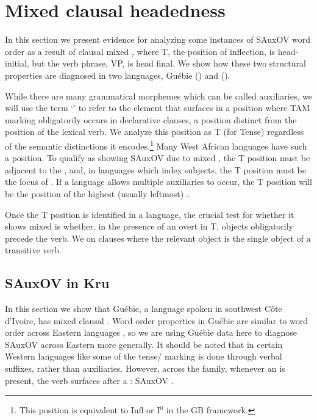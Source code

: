 \documentclass[output=paper]{LSP/langsci}
\begin{document}
\section{Mixed clausal headedness}\label{sec:strictSAuxOV}

In this section we present evidence for analyzing some instances of SAuxOV word order as a result of clausal mixed , where T, the position of inflection, is head-initial, but the verb phrase, VP, is head final. We show how these two structural properties are diagnosed in two languages, Gu\'ebie  () and  ().

While there are many grammatical morphemes which can be called auxiliaries, we will use the term `' to refer to the element that surfaces in a position where TAM marking obligatorily occurs in declarative clauses, a position distinct from the position of the lexical verb. We analyze this position as T (for Tense) regardless of the semantic distinctions it encodes.\footnote{This position is equivalent to Infl or I$^0$ in the GB framework.} Many West African languages have such a position. To qualify as showing SAuxOV due to mixed , the T position must be adjacent to the , and, in languages which index subjects, the T position must be the locus of . If a language allows multiple auxiliaries to occur, the T position will be the position of the highest (usually leftmost) .

Once the T position is identified in a language, the crucial test for whether it shows mixed  is whether, in the presence of an overt  in T, objects obligatorily precede the verb. We  on clauses where the relevant object is the single object of a transitive verb.

\subsection{SAuxOV in Kru}

In this section we show that Gu\'ebie, a  language spoken in southwest C\^ote d'Ivoire, has mixed clausal . Word order properties in Gu\'ebie are similar to word order across Eastern  languages \citep[cf.][]{Marchese1979}, so we are using Gu\'ebie data here to diagnose SAuxOV across Eastern  more generally. It should be noted that in certain Western  languages like  \citep{Innes:1966} some of the tense/ marking is done through verbal suffixes, rather than auxiliaries. However, across the family, whenever an  is present, the verb surfaces after a : SAuxOV \citep{Marchese1979}.
\end{document}
